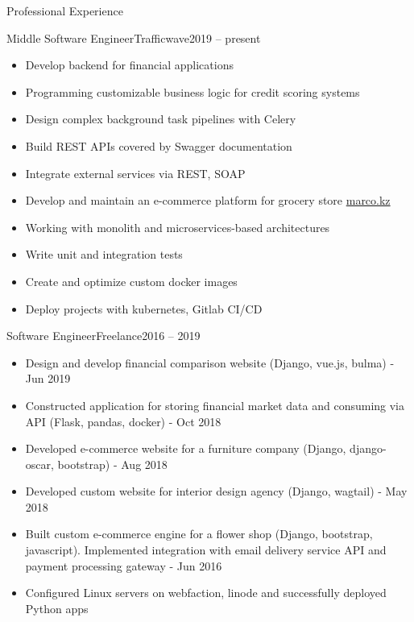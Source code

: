 \documentclass[]{mcdowellcv}
\begin{document}
\makeheader

\begin{cvsection}{Professional Experience}
  \begin{cvsubsection}{Middle Software Engineer}{Trafficwave}{2019 -- present}
    \begin{itemize}
      \item Develop backend for financial applications
      \item Programming customizable business logic for credit scoring systems
      \item Design complex background task pipelines with Celery
      \item Build REST APIs covered by Swagger documentation
      \item Integrate external services via REST, SOAP
      \item Develop and maintain an e-commerce platform for grocery store \href{https://marco.kz/}{marco.kz}
      \item Working with monolith and microservices-based architectures
      \item Write unit and integration tests
      \item Create and optimize custom docker images
      \item Deploy projects with kubernetes, Gitlab CI/CD
    \end{itemize}
  \end{cvsubsection}

  \begin{cvsubsection}{Software Engineer}{Freelance}{2016 -- 2019}
    \begin{itemize}
      \item Design and develop financial comparison website (Django, vue.js, bulma) - Jun 2019
      \item Constructed application for storing financial market data and consuming via API (Flask, pandas, docker) - Oct 2018
      \item Developed e-commerce website for a furniture company (Django, django-oscar, bootstrap) - Aug 2018
      \item Developed custom website for interior design agency (Django, wagtail) - May 2018
      \item Built custom e-commerce engine for a flower shop (Django, bootstrap, javascript). Implemented integration with email delivery service API and payment processing gateway - Jun 2016
      \item Configured Linux servers on webfaction, linode and successfully deployed Python apps
    \end{itemize}
  \end{cvsubsection}


\end{cvsection}
\end{document}
